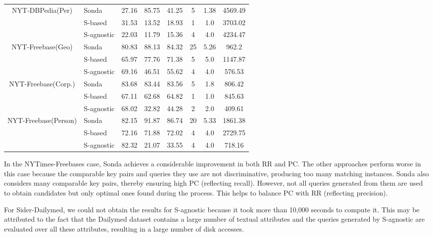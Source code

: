 \begin{table}
\begin{tabular}{|c|l|c|c|c|c|c|c|}
\multirow{3}{*}{NYT-DBPedia(Per)} & Sonda & 27.16 & 85.75 & 41.25  & 5 & 1.38   & 4569.49  \\
											& S-based  & 31.53 & 13.52 & 18.93  & 1 & 1.0   & 3703.02\\
 											& S-agnostic   & 22.03 & 11.79 & 15.36  & 4 & 4.0   & 4234.47    \\ \hline 											
 		
 		
\multirow{3}{*}{NYT-Freebase(Geo)} & Sonda  & 80.83 & 88.13 & 84.32  & 25 & 5.26   & 962.2   \\
											& S-based    & 65.97 & 77.76 & 71.38  & 5 & 5.0   & 1147.87\\
 											& S-agnostic    & 69.16 & 46.51 & 55.62  & 4 & 4.0   & 576.53     \\ \hline 											
 
 

\multirow{3}{*}{NYT-Freebase(Corp.)} & Sonda  & 83.68 & 83.44 & 83.56  & 5 & 1.8   & 806.42   \\
											& S-based    & 67.11 & 62.68 & 64.82  & 1 & 1.0   & 845.63 \\
 											& S-agnostic          & 68.02 & 32.82 & 44.28  & 2 & 2.0   & 409.61\\ \hline 					
 											
\multirow{3}{*}{NYT-Freebase(Person)} & Sonda  & 82.15 & 91.87 & 86.74  & 20 & 5.33   & 1861.38\\
											& S-based      & 72.16 & 71.88 & 72.02  & 4 & 4.0   & 2729.75\\
 											& S-agnostic   & 82.32 & 21.07 & 33.55  & 4 & 4.0   & 718.16    \\ \hline 								

\end{tabular}
\end{table}

In the NYTimes-Freebases case, Sonda achieves a considerable improvement in both RR and PC. The other approaches perform worse in this case because the comparable key pairs and queries they use are not discriminative, producing too many matching instances. Sonda also considers many comparable key pairs, thereby ensuring high PC (reflecting recall). However, not all queries generated from them are used to obtain candidates but only optimal ones found during the process. This helps to balance PC with RR (reflecting precision). 

For Sider-Dailymed, we could not obtain the results for S-agnostic because it took more than 10,000 seconds to compute it. This may be attributed to the fact that the Dailymed dataset contains a large number of textual attributes and the queries generated by S-agnostic are evaluated over all these attributes, resulting in a large number of disk accesses.

